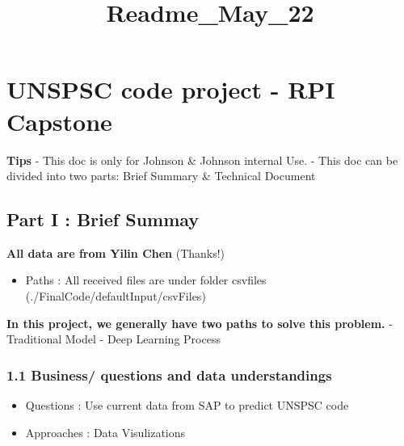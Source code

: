 \documentclass[11pt]{article}
\title{Readme\_May\_22}
\providecommand{\tightlist}{%
      \setlength{\itemsep}{0pt}\setlength{\parskip}{0pt}}
\begin{document}
    
    
    \maketitle
    
    

    
    

    \hypertarget{unspsc-code-project---rpi-capstone}{%
\section{UNSPSC code project - RPI
Capstone}\label{unspsc-code-project---rpi-capstone}}

\textbf{Tips} - This doc is only for Johnson \& Johnson internal Use. -
This doc can be divided into two parts: Brief Summary \& Technical
Document

    \hypertarget{part-i-brief-summay}{%
\subsection{Part I : Brief Summay}\label{part-i-brief-summay}}

    \textbf{All data are from Yilin Chen} (Thanks!)

\begin{itemize}
\tightlist
\item
  Paths : All received files are under folder csvfiles
  (./FinalCode/defaultInput/csvFiles)
\end{itemize}

\textbf{In this project, we generally have two paths to solve this
problem.} - Traditional Model - Deep Learning Process

    \hypertarget{business-questions-and-data-understandings}{%
\subsubsection{1.1 Business/ questions and data
understandings}\label{business-questions-and-data-understandings}}

    \begin{itemize}
\tightlist
\item
  Questions : Use current data from SAP to predict UNSPSC code
\item
  Approaches : Data Visulizations
\end{itemize}

    
\end{document}
